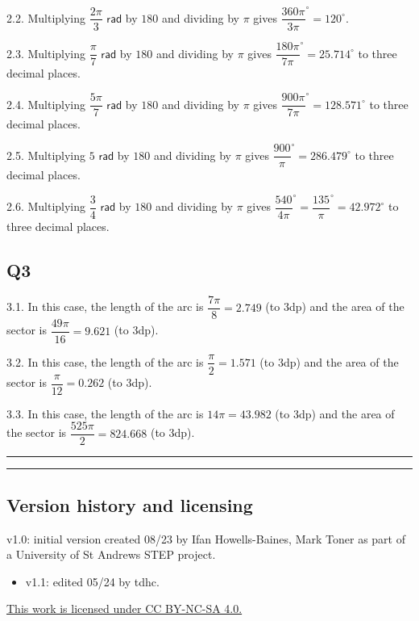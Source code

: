 \documentclass[
  12pt,
  a4paper, oneside]{starmastarticle}
\providecommand{\tightlist}{%
  \setlength{\itemsep}{0pt}\setlength{\parskip}{0pt}}\usepackage{longtable,booktabs,array}
\begin{document}
2.2. Multiplying \(\dfrac{2\pi}{3}\textsf{ rad}\) by \(180\) and
dividing by \(\pi\) gives \(\dfrac{360\pi}{3\pi} ^\circ = 120 ^\circ\).

2.3. Multiplying \(\dfrac{\pi}{7} \textsf{ rad}\) by \(180\) and
dividing by \(\pi\) gives
\(\dfrac{180\pi}{7\pi} ^\circ = 25.714 ^\circ\) to three decimal places.

2.4. Multiplying \(\dfrac{5\pi}{7}\textsf{ rad}\) by \(180\) and
dividing by \(\pi\) gives
\(\dfrac{900\pi}{7\pi} ^\circ = 128.571 ^\circ\) to three decimal
places.

2.5. Multiplying \(5\textsf{ rad}\) by \(180\) and dividing by \(\pi\)
gives \(\dfrac{900}{\pi} ^\circ = 286.479 ^\circ\) to three decimal
places.

2.6. Multiplying \(\dfrac{3}{4} \textsf{ rad}\) by \(180\) and dividing
by \(\pi\) gives
\(\dfrac{540}{4\pi} ^\circ = \dfrac{135}{\pi} ^\circ = 42.972 ^\circ\)
to three decimal places.

\subsection*{Q3}\label{q3}

3.1. In this case, the length of the arc is \(\dfrac{7\pi}{8} = 2.749\)
(to 3dp) and the area of the sector is \(\dfrac{49\pi}{16} = 9.621\) (to
3dp).

3.2. In this case, the length of the arc is \(\dfrac{\pi}{2} = 1.571\)
(to 3dp) and the area of the sector is \(\dfrac{\pi}{12} = 0.262\) (to
3dp).

3.3. In this case, the length of the arc is \(14\pi = 43.982\) (to 3dp)
and the area of the sector is \(\dfrac{525\pi}{2} = 824.668\) (to 3dp).

\begin{center}\rule{0.5\linewidth}{0.5pt}\end{center}

\begin{center}\rule{0.5\linewidth}{0.5pt}\end{center}

\subsection*{Version history and
licensing}\label{version-history-and-licensing}

v1.0: initial version created 08/23 by Ifan Howells-Baines, Mark Toner
as part of a University of St Andrews STEP project.

\begin{itemize}
\tightlist
\item
  v1.1: edited 05/24 by tdhc.
\end{itemize}

\href{https://creativecommons.org/licenses/by-nc-sa/4.0/?ref=chooser-v1}{This
work is licensed under CC BY-NC-SA 4.0.}
\end{document}
